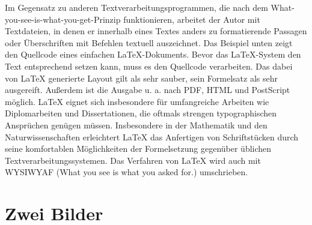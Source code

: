 \documentclass{scrreprt}
\begin{document}
Im Gegensatz zu anderen Textverarbeitungsprogrammen, die nach dem What-you-see-is-what-you-get-Prinzip funktionieren, arbeitet der Autor mit Textdateien, in denen er innerhalb eines Textes anders zu formatierende Passagen oder Überschriften mit Befehlen textuell auszeichnet. Das Beispiel unten zeigt den Quellcode eines einfachen LaTeX-Dokuments. Bevor das LaTeX-System den Text entsprechend setzen kann, muss es den Quellcode verarbeiten. Das dabei von LaTeX generierte Layout gilt als sehr sauber, sein Formelsatz als sehr ausgereift. Außerdem ist die Ausgabe u. a. nach PDF, HTML und PostScript möglich. LaTeX eignet sich insbesondere für umfangreiche Arbeiten wie Diplomarbeiten und Dissertationen, die oftmals strengen typographischen Ansprüchen genügen müssen. Insbesondere in der Mathematik und den Naturwissenschaften erleichtert LaTeX das Anfertigen von Schriftstücken durch seine komfortablen Möglichkeiten der Formelsetzung gegenüber üblichen Textverarbeitungssystemen. Das Verfahren von LaTeX wird auch mit WYSIWYAF (What you see is what you asked for.) umschrieben. 

\newpage

\section{Zwei Bilder \cite{ref4}}
\end{document}

